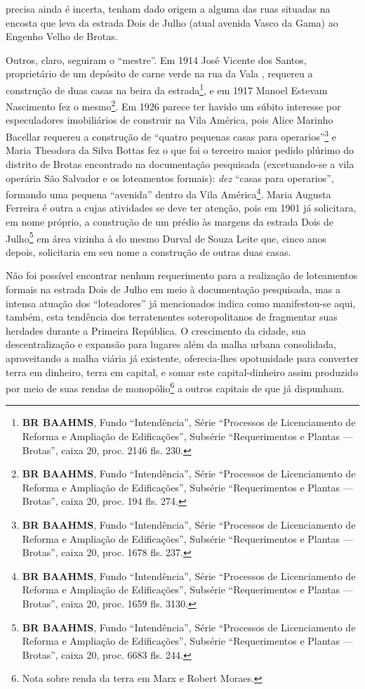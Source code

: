 precisa ainda é incerta, tenham dado origem a alguma das ruas situadas na encosta que leva da estrada Dois de Julho (atual avenida Vasco da Gama) ao Engenho Velho de Brotas.

Outros, claro, seguiram o ``mestre''. Em 1914 José Vicente dos Santos, proprietário de um depósito de carne verde na rua da Vala \cite[p.~402]{reis_almanak_1898}, requereu a construção de duas casas na beira da estrada\footnote{\textbf{BR BAAHMS}, Fundo ``Intendência'', Série ``Processos de Licenciamento de Reforma e Ampliação de Edificações'', Subsérie ``Requerimentos e Plantas --- Brotas'', caixa 20, proc. 2146 fls. 230.}, e em 1917 Manoel Estevam Nascimento fez o mesmo\footnote{\textbf{BR BAAHMS}, Fundo ``Intendência'', Série ``Processos de Licenciamento de Reforma e Ampliação de Edificações'', Subsérie ``Requerimentos e Plantas --- Brotas'', caixa 20, proc. 194 fls. 274.}. Em 1926 parece ter havido um súbito interesse por especuladores imobiliários de construir na Vila América, pois Alice Marinho Bacellar requereu a construção de ``quatro pequenas casas para operarios''\footnote{\textbf{BR BAAHMS}, Fundo ``Intendência'', Série ``Processos de Licenciamento de Reforma e Ampliação de Edificações'', Subsérie ``Requerimentos e Plantas --- Brotas'', caixa 20, proc. 1678 fls. 237.} e Maria Theodora da Silva Bottas fez o que foi o terceiro maior pedido plúrimo do distrito de Brotas encontrado na documentação pesquisada (excetuando-se a vila operária São Salvador e os loteamentos formais): \textit{dez} ``casas para operarios'', formando uma pequena ``avenida'' dentro da Vila América\footnote{\textbf{BR BAAHMS}, Fundo ``Intendência'', Série ``Processos de Licenciamento de Reforma e Ampliação de Edificações'', Subsérie ``Requerimentos e Plantas --- Brotas'', caixa 20, proc. 1659 fls. 3130.}. Maria Augusta Ferreira é outra a cujas atividades se deve ter atenção, pois em 1901 já solicitara, em nome próprio, a construção de um prédio às margens da estrada Dois de Julho\footnote{\textbf{BR BAAHMS}, Fundo ``Intendência'', Série ``Processos de Licenciamento de Reforma e Ampliação de Edificações'', Subsérie ``Requerimentos e Plantas --- Brotas'', caixa 20, proc. 6683 fls. 244.} em área vizinha à do mesmo Durval de Souza Leite que, cinco anos depois, solicitaria em seu nome a construção de outras duas casas.


Não foi possível encontrar nenhum requerimento para a realização de loteamentos formais na estrada Dois de Julho em meio à documentação pesquisada, mas a intensa atuação dos ``loteadores'' já mencionados indica como manifestou-se aqui, também, esta tendência dos terratenentes soteropolitanos de fragmentar suas herdades durante a Primeira República. O crescimento da cidade, sua descentralização e expansão para lugares além da malha urbana consolidada, aproveitando a malha viária já existente, oferecia-lhes opotunidade para converter terra em dinheiro, terra em capital, e somar este capital-dinheiro assim produzido por meio de suas rendas de monopólio\footnote{Nota sobre renda da terra em Marx e Robert Moraes.} a outros capitais de que já dispunham.

